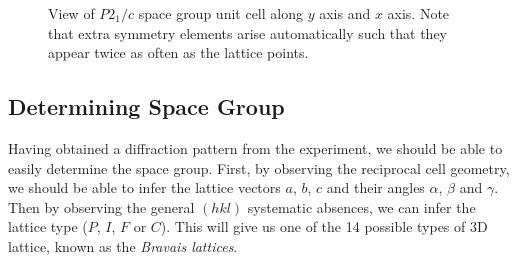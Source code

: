 \documentclass{article}
\theoremstyle{plain}\theoremheaderfont{\normalfont\itshape}\theorembodyfont{\rmfamily}\theoremseparator{.}\newtheorem*{rem}{Remark}\newtheorem*{ex}{Example}\newtheorem*{proof}{Proof}\newtheorem*{altp}{Alternative proof}
\theoremstyle{plain}\theoremheaderfont{\normalfont\bfseries}\theorembodyfont{\rmfamily}\theoremseparator{.}\newtheorem{thm}{Theorem}[section]\newtheorem{lem}[thm]{Lemma}\newtheorem{prop}[thm]{Proposition}\newtheorem*{cor}{Corollary}\newtheorem{defn}[thm]{Definition}\newtheorem{clm}[thm]{Claim}\newtheorem{clminproof}{Claim}\newtheorem*{law}{Law}\newtheorem{pos}[thm]{Postulate}
\theoremstyle{break}\theoremheaderfont{\normalfont\itshape}\theorembodyfont{\rmfamily}\theoremseparator{.\medskip}\newtheorem*{proofskip}{Proof}\newtheorem*{exs}{Examples}\newtheorem*{rems}{Remarks}
\theoremstyle{break}\theoremheaderfont{\normalfont\bfseries}\theorembodyfont{\rmfamily}\theoremseparator{.\medskip}\newtheorem{lemskip}[thm]{Lemma}\newtheorem{defnskip}[thm]{Definition}\newtheorem{propskip}[thm]{Proposition}\newtheorem{thmskip}[thm]{Theorem}
\numberwithin{equation}{section}
\begin{document}
\begin{figure}
        \caption{View of \(P2_1/c\) space group unit cell along \(y\) axis and \(x\) axis. Note that extra symmetry elements arise automatically such that they appear twice as often as the lattice points.}
    \end{figure}

    \subsection{Determining Space Group}
    Having obtained a diffraction pattern from the experiment, we should be able to easily determine the space group. First, by observing the reciprocal cell geometry, we should be able to infer the lattice vectors \(a\), \(b\), \(c\) and their angles \(\alpha\), \(\beta\) and \(\gamma\). Then by observing the general \((hkl)\) systematic absences, we can infer the lattice type (\(P\), \(I\), \(F\) or \(C\)). This will give us one of the 14 possible types of 3D lattice, known as the \textit{Bravais lattices}.
\end{document}

